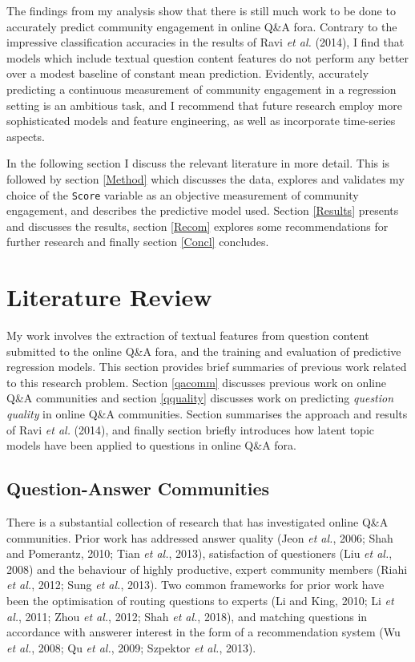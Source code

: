 \documentclass[11pt,preprint, authoryear]{article}
\begin{document}
The findings from my analysis show that there is still much work to be
done to accurately predict community engagement in online Q\&A fora.
Contrary to the impressive classification accuracies in the results of
Ravi \emph{et al.} (2014), I find that models which include textual
question content features do not perform any better over a modest
baseline of constant mean prediction. Evidently, accurately predicting a
continuous measurement of community engagement in a regression setting
is an ambitious task, and I recommend that future research employ more
sophisticated models and feature engineering, as well as incorporate
time-series aspects.

In the following section I discuss the relevant literature in more
detail. This is followed by section \ref{Method} which discusses the
data, explores and validates my choice of the \texttt{Score} variable as
an objective measurement of community engagement, and describes the
predictive model used. Section \ref{Results} presents and discusses the
results, section \ref{Recom} explores some recommendations for further
research and finally section \ref{Concl} concludes.

\newpage

\section{\texorpdfstring{Literature Review
\label{Lit}}{Literature Review }}\label{literature-review}

My work involves the extraction of textual features from question
content submitted to the online Q\&A fora, and the training and
evaluation of predictive regression models. This section provides brief
summaries of previous work related to this research problem. Section
\ref{qacomm} discusses previous work on online Q\&A communities and
section \ref{qquality} discusses work on predicting \emph{question
quality} in online Q\&A communities. Section \label{ravi} summarises the
approach and results of Ravi \emph{et al.} (2014), and finally section
\label{lda_lit} briefly introduces how latent topic models have been
applied to questions in online Q\&A fora.

\subsection{\texorpdfstring{Question-Answer Communities
\label{qacomm}}{Question-Answer Communities }}\label{question-answer-communities}

There is a substantial collection of research that has investigated
online Q\&A communities. Prior work has addressed answer quality (Jeon
\emph{et al.}, 2006; Shah and Pomerantz, 2010; Tian \emph{et al.},
2013), satisfaction of questioners (Liu \emph{et al.}, 2008) and the
behaviour of highly productive, expert community members (Riahi \emph{et
al.}, 2012; Sung \emph{et al.}, 2013). Two common frameworks for prior
work have been the optimisation of routing questions to experts (Li and
King, 2010; Li \emph{et al.}, 2011; Zhou \emph{et al.}, 2012; Shah
\emph{et al.}, 2018), and matching questions in accordance with answerer
interest in the form of a recommendation system (Wu \emph{et al.}, 2008;
Qu \emph{et al.}, 2009; Szpektor \emph{et al.}, 2013).
\end{document}
